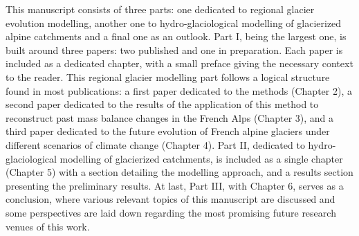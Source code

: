 This manuscript consists of three parts: one dedicated to regional glacier evolution modelling, another one to hydro-glaciological modelling of glacierized alpine catchments and a final one as an outlook. Part I, being the largest one, is built around three papers: two published and one in preparation. Each paper is included as a dedicated chapter, with a small preface giving the necessary context to the reader. This regional glacier modelling part follows a logical structure found in most publications: a first paper dedicated to the methods (Chapter 2), a second paper dedicated to the results of the application of this method to reconstruct past mass balance changes in the French Alps (Chapter 3), and a third paper dedicated to the future evolution of French alpine glaciers under different scenarios of climate change (Chapter 4). Part II, dedicated to hydro-glaciological modelling of glacierized catchments, is included as a single chapter (Chapter 5) with a section detailing the modelling approach, and a results section presenting the preliminary results. At last, Part III, with Chapter 6, serves as a conclusion, where various relevant topics of this manuscript are discussed and some perspectives are laid down regarding the most promising future research venues of this work.